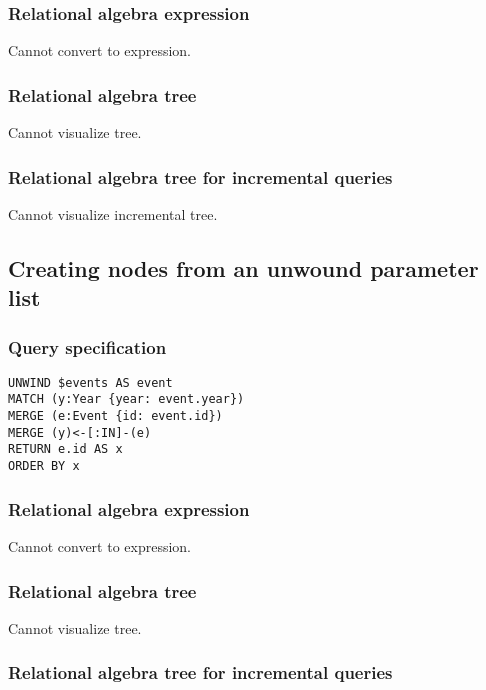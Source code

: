 \subsubsection*{Relational algebra expression}

Cannot convert to expression.

\subsubsection*{Relational algebra tree}

Cannot visualize tree.

\subsubsection*{Relational algebra tree for incremental queries}

Cannot visualize incremental tree.

\subsection{Creating nodes from an unwound parameter list}

\subsubsection*{Query specification}

\begin{lstlisting}
UNWIND $events AS event
MATCH (y:Year {year: event.year})
MERGE (e:Event {id: event.id})
MERGE (y)<-[:IN]-(e)
RETURN e.id AS x
ORDER BY x
\end{lstlisting}

\subsubsection*{Relational algebra expression}

Cannot convert to expression.

\subsubsection*{Relational algebra tree}

Cannot visualize tree.

\subsubsection*{Relational algebra tree for incremental queries}

